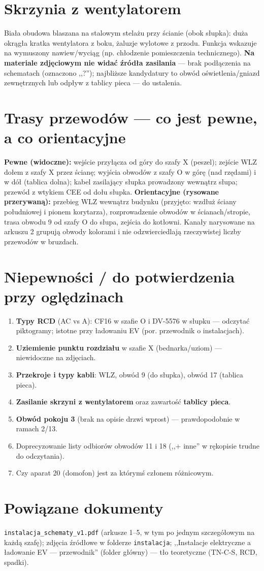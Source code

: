 \documentclass[11pt,a4paper]{article}
\begin{document}
\section{Skrzynia z wentylatorem}
Biała obudowa blaszana na stalowym stelażu przy ścianie (obok słupka): duża okrągła kratka
wentylatora z boku, żaluzje wylotowe z przodu. Funkcja wskazuje na wymuszony nawiew/wyciąg
(np. chłodzenie pomieszczenia technicznego). \textbf{Na materiale zdjęciowym nie widać źródła
zasilania} --- brak podłączenia na schematach (oznaczono ,,?''); najbliższe kandydatury to obwód
oświetlenia/gniazd zewnętrznych lub odpływ z tablicy pieca --- do ustalenia.

\section{Trasy przewodów --- co jest pewne, a co orientacyjne}
\textbf{Pewne (widoczne):} wejście przyłącza od góry do szafy X (peszel); zejście WLZ dołem
z szafy X przez ścianę; wyjścia obwodów z szafy O w górę (nad rzędami) i w dół (tablica dolna);
kabel zasilający słupka prowadzony wewnątrz słupa; przewód z wtykiem CEE od dołu słupka.
\textbf{Orientacyjne (rysowane przerywaną):} przebieg WLZ wewnątrz budynku (przyjęto: wzdłuż
ściany południowej i pionem korytarza), rozprowadzenie obwodów w ścianach/stropie, trasa obwodu 9
od szafy O do słupa, zejścia do kotłowni. Kanały narysowane na arkuszu 2 grupują obwody kolorami
i nie odzwierciedlają rzeczywistej liczby przewodów w bruzdach.

\section{Niepewności / do potwierdzenia przy oględzinach}
\label{sec:niepewnosci}
\begin{enumerate}
\item \textbf{Typy RCD} (AC vs A): CF16 w szafie O i DV-5576 w słupku --- odczytać piktogramy;
istotne przy ładowaniu EV (por. przewodnik o instalacjach).
\item \textbf{Uziemienie punktu rozdziału} w szafie X (bednarka/uziom) --- niewidoczne na zdjęciach.
\item \textbf{Przekroje i typy kabli}: WLZ, obwód 9 (do słupka), obwód 17 (tablica pieca).
\item \textbf{Zasilanie skrzyni z wentylatorem} oraz zawartość \textbf{tablicy pieca}.
\item \textbf{Obwód pokoju 3} (brak na opisie drzwi wprost) --- prawdopodobnie w ramach 2/13.
\item Doprecyzowanie listy odbiorów obwodów 11 i 18 (,,$+$ inne'' w rękopisie trudne do odczytania).
\item Czy aparat 20 (domofon) jest za którymś członem różnicowym.
\end{enumerate}

\section{Powiązane dokumenty}
\texttt{instalacja\_schematy\_v1.pdf} (arkusze 1--5, w tym po jednym szczegółowym na każdą szafę);
zdjęcia źródłowe w folderze \texttt{instalacja}; ,,Instalacje elektryczne a ładowanie EV ---
przewodnik'' (folder główny) --- tło teoretyczne (TN-C-S, RCD, spadki).
\end{document}
